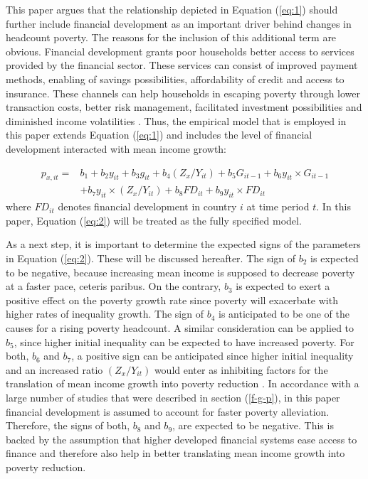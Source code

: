 \documentclass[12pt, a4paper]{article}
\begin{document}
This paper argues that the relationship depicted in Equation (\ref{eq:1}) should further include financial development as an important driver behind changes in headcount poverty. The reasons for the inclusion of this additional term are obvious. Financial development grants poor households better access to services provided by the financial sector. These services can consist of improved payment methods, enabling of savings possibilities, affordability of credit and access to insurance. These channels can help households in escaping poverty through lower transaction costs, better risk management, facilitated investment possibilities and diminished income volatilities \cite{claessens2007}. Thus, the empirical model that is employed in this paper extends Equation (\ref{eq:1}) and includes the level of financial development interacted with mean income growth:

\begin{equation} \label{eq:2}
\begin{split}
p_{x,it} ={} 	& b_{1} + b_{2}y_{it} + b_{3}g_{it} + b_{4}(Z_{x}/Y_{it}) + b_{5}G_{it-1} + b_{6}y_{it}\times G_{it-1} \\&+ b_{7}y_{it}\times (Z_{x}/Y_{it}) + b_{8}FD_{it} + b_{9}y_{it}\times FD_{it}
\end{split}
\end{equation}
where $FD_{it}$ denotes financial development in country $i$ at time period $t$. In this paper, Equation (\ref{eq:2}) will be treated as the fully specified model.

As a next step, it is important to determine the expected signs of the parameters in Equation (\ref{eq:2}). These will be discussed hereafter. The sign of $b_{2}$ is expected to be negative, because increasing mean income is supposed to decrease poverty at a faster pace, ceteris paribus. On the contrary, $b_{3}$ is expected to exert a positive effect on the poverty growth rate since poverty will exacerbate with higher rates of inequality growth. The sign of $b_{4}$ is anticipated to be one of the causes for a rising poverty headcount. A similar consideration can be applied to $b_{5}$, since higher initial inequality can be expected to have increased poverty. For both, $b_{6}$ and $b_{7}$, a positive sign can be anticipated since higher initial inequality and an increased ratio $(Z_{x}/Y_{it})$ would enter as inhibiting factors for the translation of mean income growth into poverty reduction \cite{fosu2009}. In accordance with a large number of studies that were described in section (\ref{f-g-p}), in this paper financial development is assumed to account for faster poverty alleviation. Therefore, the signs of both, $b_{8}$ and $b_{9}$, are expected to be negative. This is backed by the assumption that higher developed financial systems ease access to finance and therefore also help in better translating mean income growth into poverty reduction.
\end{document}
